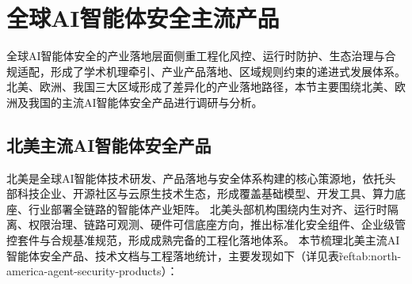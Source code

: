 

\section{全球AI智能体安全主流产品}
全球AI智能体安全的产业落地层面侧重工程化风控、运行时防护、生态治理与合规适配，形成了学术机理牵引、产业产品落地、区域规则约束的递进式发展体系。
北美、欧洲、我国三大区域形成了差异化的产业落地路径，本节主要围绕北美、欧洲及我国的主流AI智能体安全产品进行调研与分析。

\subsection{北美主流AI智能体安全产品}
北美是全球AI智能体技术研发、产品落地与安全体系构建的核心策源地，依托头部科技企业、开源社区与云原生技术生态，形成覆盖基础模型、开发工具、算力底座、行业部署全链路的智能体产业矩阵\cite{openaichatgptagent2025,nvidiaagenttoolkit2026}。
北美头部机构围绕内生对齐、运行时隔离、权限治理、链路可观测、硬件可信底座方向，推出标准化安全组件、企业级管控套件与合规基准规范，形成成熟完备的工程化落地体系\cite{anthropicresponsiblescaling2025,googletoolgovernance2025}。
本节梳理北美主流AI智能体安全产品、技术文档与工程落地统计，主要发现如下（详见表\~ref{tab:north-america-agent-security-products}）：

